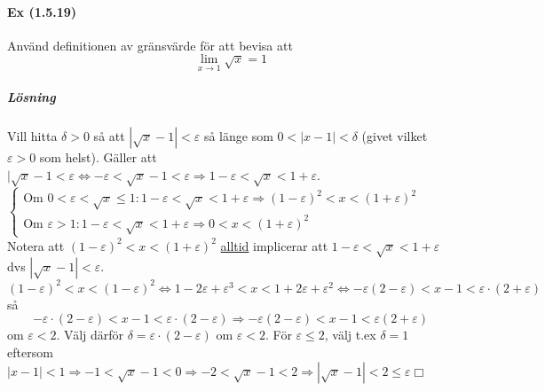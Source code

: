 \paragraph{Ex (1.5.19)}Använd definitionen av gränsvärde för att bevisa att
\begin{equation*}
    \lim_{x\to 1}\sqrt{x}=1
\end{equation*}
\subparagraph{Lösning} Vill hitta $\delta > 0$ så att
$|\sqrt{x}-1|<\varepsilon$ så länge som $0< |x-1| <\delta$
(givet vilket $\varepsilon>0$ som helst).
Gäller att $|\sqrt{x}-1<\varepsilon\Leftrightarrow-\varepsilon<\sqrt{x}-1<\varepsilon\Rightarrow 1-\varepsilon<\sqrt{x}<1+\varepsilon$.
$\left\{\begin{matrix}
        \text{Om }0<\varepsilon<\sqrt{x}\leq 1: 1-\varepsilon<\sqrt{x}<1+\varepsilon\Rightarrow(1-\varepsilon)^2<x<(1+\varepsilon)^2 \\
        \text{Om }\varepsilon>1:1-\varepsilon<\sqrt{x}<1+\varepsilon\Rightarrow 0<x<(1+\varepsilon)^2
    \end{matrix}\right.$
Notera att $(1-\varepsilon)^2<x<(1+\varepsilon)^2$ \underline{alltid} implicerar att $1-\varepsilon<\sqrt{x}<1+\varepsilon$ dvs $|\sqrt{x}-1|<\varepsilon$.
\begin{equation*}
    (1-\varepsilon)^2<x<(1-\varepsilon)^2\Leftrightarrow 1-2\varepsilon+\varepsilon^3<x<1+2\varepsilon+\varepsilon^2\Leftrightarrow-\varepsilon(2-\varepsilon)<x-1<\varepsilon\cdot(2+\varepsilon)
\end{equation*}
så \begin{equation*}
    -\varepsilon\cdot(2-\varepsilon)<x-1<\varepsilon\cdot(2-\varepsilon)\Rightarrow-\varepsilon(2-\varepsilon)<x-1<\varepsilon(2+\varepsilon)
\end{equation*}
om $\varepsilon<2$.
Välj därför $\delta=\varepsilon\cdot(2-\varepsilon)$ om $\varepsilon<2$.
För $\varepsilon\leq 2$, välj t.ex $\delta=1$ eftersom $|x-1|<1\Rightarrow-1<\sqrt{x}-1<0\Rightarrow-2<\sqrt{x}-1<2\Rightarrow|\sqrt{x}-1|<2\leq\varepsilon\Box$
